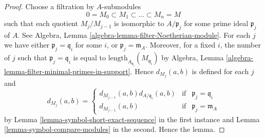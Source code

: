 \documentclass[10pt,a4paper]{amsart}
\theoremstyle{plain}
\theoremstyle{definition}
\theoremstyle{remark}
\numberwithin{equation}{subsection}
\begin{document}
\begin{proof}
Choose a filtration by $A$-submodules
$$
0 = M_0 \subset M_1 \subset \ldots \subset M_n = M
$$
such that each quotient $M_j/M_{j - 1}$ is isomorphic
to $A/\mathfrak p_j$ for some prime ideal $\mathfrak p_j$
of $A$. See Algebra, Lemma \ref{algebra-lemma-filter-Noetherian-module}.
For each $j$ we have either $\mathfrak p_j = \mathfrak q_i$
for some $i$, or $\mathfrak p_j = \mathfrak m_A$. Moreover,
for a fixed $i$, the number of $j$ such that
$\mathfrak p_j = \mathfrak q_i$ is equal to
$\text{length}_{A_{\mathfrak q_i}}(M_{\mathfrak q_i})$ by
Algebra, Lemma \ref{algebra-lemma-filter-minimal-primes-in-support}.
Hence $d_{M_j}(a, b)$ is defined for each $j$ and
$$
d_{M_j}(a, b)
=
\left\{
\begin{matrix}
d_{M_{j - 1}}(a, b) d_{A/\mathfrak q_i}(a, b) &
\text{if} & \mathfrak p_j = \mathfrak q_i \\
d_{M_{j - 1}}(a, b) & \text{if} & \mathfrak p_j = \mathfrak m_A
\end{matrix}
\right.
$$
by Lemma \ref{lemma-symbol-short-exact-sequence} in the first instance
and Lemma \ref{lemma-symbol-compare-modules} in the second. Hence the lemma.
\end{proof}
\end{document}
